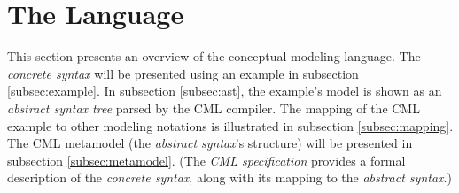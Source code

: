 \section{The Language}\label{sec:lang}
%
This section presents an overview of the conceptual modeling language.
The \emph{concrete syntax} will be presented using an example in subsection \ref{subsec:example}. 
In subsection \ref{subsec:ast},
the example's model is shown as an \emph{abstract syntax tree} parsed by the CML compiler.
The mapping of the CML example to other modeling notations is illustrated in subsection \ref{subsec:mapping}.
The CML metamodel (the \emph{abstract syntax}'s structure) will be presented in subsection \ref{subsec:metamodel}. 
(The \emph{CML specification} \cite{cml-spec} provides a formal description of the \emph{concrete syntax},
along with its mapping to the \emph{abstract syntax}.)







